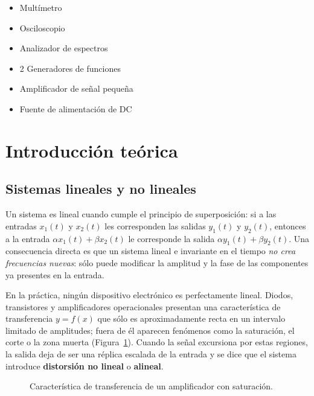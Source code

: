 \documentclass[12pt]{article}
\begin{document}
\begin{itemize}[label=--]
    \item Multímetro
    \item Osciloscopio
    \item Analizador de espectros
    \item 2 Generadores de funciones
    \item Amplificador de señal pequeña
    \item Fuente de alimentación de DC
\end{itemize}

\section{Introducción teórica}

\subsection*{Sistemas lineales y no lineales}

Un sistema es lineal cuando cumple el principio de superposición: si a las entradas $x_1(t)$ y $x_2(t)$ les corresponden las salidas $y_1(t)$ y $y_2(t)$, entonces a la entrada $\alpha x_1(t) + \beta x_2(t)$ le corresponde la salida $\alpha y_1(t) + \beta y_2(t)$. Una consecuencia directa es que un sistema lineal e invariante en el tiempo \emph{no crea frecuencias nuevas}: sólo puede modificar la amplitud y la fase de las componentes ya presentes en la entrada.

En la práctica, ningún dispositivo electrónico es perfectamente lineal. Diodos, transistores y amplificadores operacionales presentan una característica de transferencia $y = f(x)$ que sólo es aproximadamente recta en un intervalo limitado de amplitudes; fuera de él aparecen fenómenos como la saturación, el corte o la zona muerta (Figura~\ref{fig:transferencia}). Cuando la señal excursiona por estas regiones, la salida deja de ser una réplica escalada de la entrada y se dice que el sistema introduce \textbf{distorsión no lineal} o \textbf{alineal}.

\begin{figure}[H]
\centering
{}
\caption{Característica de transferencia de un amplificador con saturación.}
\label{fig:transferencia}
\end{figure}
\end{document}
